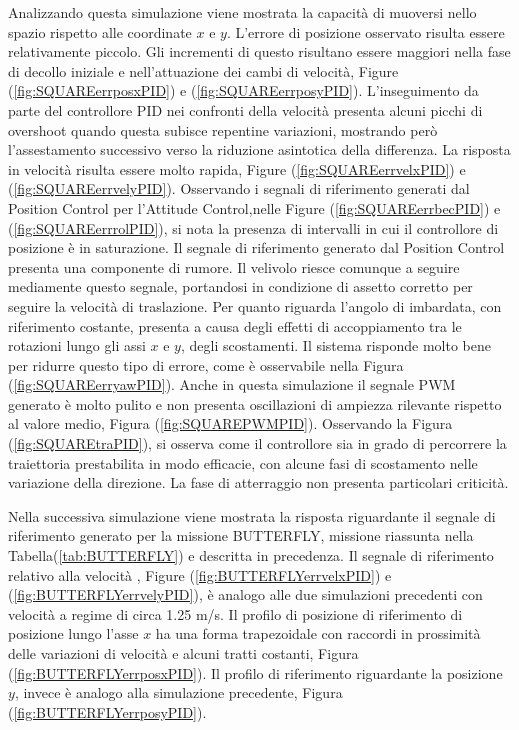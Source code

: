Analizzando questa simulazione viene mostrata la capacità di muoversi nello spazio rispetto alle coordinate $x$ e $y$. L'errore di posizione osservato risulta essere relativamente piccolo. Gli incrementi di questo risultano essere maggiori nella fase di decollo iniziale e nell'attuazione dei cambi di velocità, Figure (\ref{fig:SQUAREerrposxPID}) e (\ref{fig:SQUAREerrposyPID}). L'inseguimento da parte del controllore PID nei confronti della velocità presenta alcuni picchi di overshoot quando questa subisce repentine variazioni, mostrando però l'assestamento successivo verso la riduzione asintotica della differenza. La risposta in velocità risulta essere molto rapida, Figure (\ref{fig:SQUAREerrvelxPID}) e (\ref{fig:SQUAREerrvelyPID}). Osservando i segnali di riferimento generati dal Position Control per l'Attitude Control,nelle Figure (\ref{fig:SQUAREerrbecPID}) e (\ref{fig:SQUAREerrrolPID}), si nota la presenza di intervalli in cui il controllore di posizione è in saturazione. Il segnale di riferimento generato dal Position Control presenta una componente di rumore. Il velivolo riesce comunque a seguire mediamente questo segnale, portandosi in condizione di assetto corretto per seguire la velocità di traslazione. Per quanto riguarda l'angolo di imbardata, con riferimento costante, presenta a causa degli effetti di accoppiamento tra le rotazioni lungo gli assi $x$ e $y$, degli scostamenti. Il sistema risponde molto bene per ridurre questo tipo di errore, come è osservabile nella Figura (\ref{fig:SQUAREerryawPID}). Anche in questa simulazione il segnale PWM generato è molto pulito e non presenta oscillazioni di ampiezza rilevante rispetto al valore medio, Figura (\ref{fig:SQUAREPWMPID}). Osservando la Figura (\ref{fig:SQUAREtraPID}), si osserva come il controllore sia in grado di percorrere la traiettoria prestabilita in modo efficacie, con alcune fasi di scostamento nelle variazione della direzione. La fase di atterraggio non presenta particolari criticità.

Nella successiva simulazione viene mostrata la risposta riguardante il segnale di riferimento generato per la missione BUTTERFLY, missione riassunta nella Tabella(\ref{tab:BUTTERFLY}) e descritta in precedenza. Il segnale di riferimento relativo alla velocità , Figure (\ref{fig:BUTTERFLYerrvelxPID}) e (\ref{fig:BUTTERFLYerrvelyPID}), è analogo alle due simulazioni precedenti con velocità a regime di circa 1.25 m/s. Il profilo di posizione di riferimento di posizione lungo l'asse $x$ ha una forma trapezoidale con raccordi in prossimità delle variazioni di velocità e alcuni tratti costanti, Figura (\ref{fig:BUTTERFLYerrposxPID}). Il profilo di riferimento riguardante la posizione $y$, invece è analogo alla simulazione precedente, Figura (\ref{fig:BUTTERFLYerrposyPID}).

